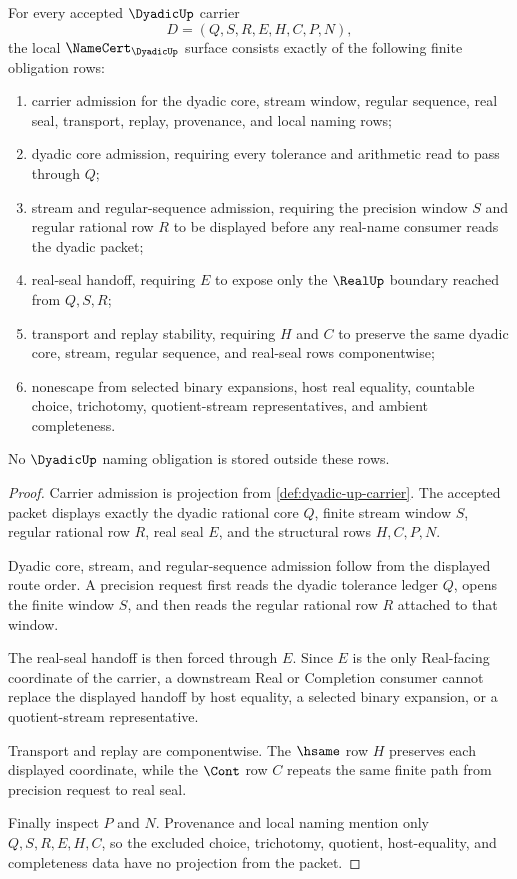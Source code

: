 \begin{theorem}
\label{thm:dyadic-up-namecert-obligations}
For every accepted $\DyadicUp$ carrier
$$
D=(Q,S,R,E,H,C,P,N),
$$
the local $\NameCert_{\DyadicUp}$ surface consists exactly of the following finite obligation rows:
\begin{enumerate}
\item carrier admission for the dyadic core, stream window, regular sequence, real seal, transport, replay, provenance, and local naming rows;
\item dyadic core admission, requiring every tolerance and arithmetic read to pass through $Q$;
\item stream and regular-sequence admission, requiring the precision window $S$ and regular rational row $R$ to be displayed before any real-name consumer reads the dyadic packet;
\item real-seal handoff, requiring $E$ to expose only the $\RealUp$ boundary reached from $Q,S,R$;
\item transport and replay stability, requiring $H$ and $C$ to preserve the same dyadic core, stream, regular sequence, and real-seal rows componentwise;
\item nonescape from selected binary expansions, host real equality, countable choice, trichotomy, quotient-stream representatives, and ambient completeness.
\end{enumerate}
No $\DyadicUp$ naming obligation is stored outside these rows.
\end{theorem}
\begin{proof}
Carrier admission is projection from \autoref{def:dyadic-up-carrier}. The accepted packet displays exactly the dyadic rational core $Q$, finite stream window $S$, regular rational row $R$, real seal $E$, and the structural rows $H,C,P,N$.

Dyadic core, stream, and regular-sequence admission follow from the displayed route order. A precision request first reads the dyadic tolerance ledger $Q$, opens the finite window $S$, and then reads the regular rational row $R$ attached to that window.

The real-seal handoff is then forced through $E$. Since $E$ is the only Real-facing coordinate of the carrier, a downstream Real or Completion consumer cannot replace the displayed handoff by host equality, a selected binary expansion, or a quotient-stream representative.

Transport and replay are componentwise. The $\hsame$ row $H$ preserves each displayed coordinate, while the $\Cont$ row $C$ repeats the same finite path from precision request to real seal.

Finally inspect $P$ and $N$. Provenance and local naming mention only $Q,S,R,E,H,C$, so the excluded choice, trichotomy, quotient, host-equality, and completeness data have no projection from the packet.
\end{proof}

